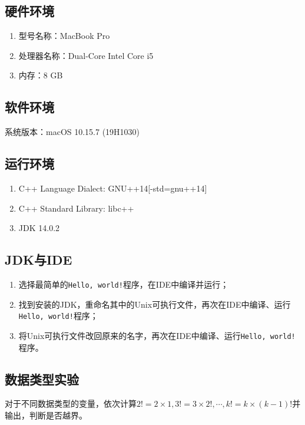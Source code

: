 \documentclass[11pt]{homework}
\begin{document}
\maketitle


  \subsection*{硬件环境}
  \begin{enumerate}
    \item 型号名称：MacBook Pro
    \item 处理器名称：Dual-Core Intel Core i5
    \item 内存：8 GB
  \end{enumerate}

  \subsection*{软件环境}

  系统版本：macOS 10.15.7 (19H1030)

  \subsection*{运行环境}

  \begin{enumerate}
    \item C++ Language Dialect: GNU++14[-std=gnu++14]
    \item C++ Standard Library: libc++
    \item JDK 14.0.2
  \end{enumerate}


\subsection*{JDK与IDE}
\begin{enumerate}
  \item 选择最简单的\verb|Hello, world!|程序，在IDE中编译并运行；
  \item 找到安装的JDK，重命名其中的Unix可执行文件，再次在IDE中编译、运行\verb|Hello, world!|程序；
  \item 将Unix可执行文件改回原来的名字，再次在IDE中编译、运行\verb|Hello, world!|程序。
\end{enumerate}

\subsection*{数据类型实验}
对于不同数据类型的变量，依次计算$2!=2\times1, 3!=3\times2!, \cdots, k!=k\times(k-1)!$并输出，判断是否越界。
\end{document}
